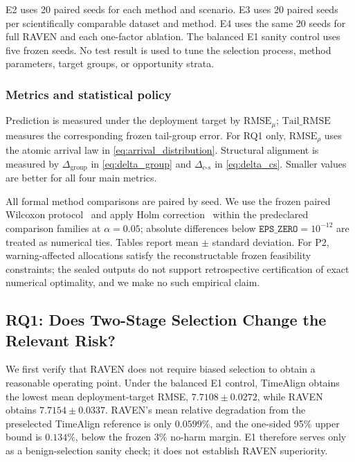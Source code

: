 \documentclass[letterpaper,journal]{IEEEtran}
\begin{document}
E2 uses 20 paired seeds for each method and scenario.  E3 uses 20 paired seeds
per scientifically comparable dataset and method.  E4 uses the same 20 seeds
for full RAVEN and each one-factor ablation.  The balanced E1 sanity control
uses five frozen seeds.  No test result is used to tune the selection process,
method parameters, target groups, or opportunity strata.

\subsubsection{Metrics and statistical policy}

Prediction is measured under the deployment target by $\mathrm{RMSE}_{\mu}$;
$\mathrm{Tail\_RMSE}$ measures the corresponding frozen tail-group error.
For RQ1 only, $\mathrm{RMSE}_{\rho}$ uses the atomic arrival law in
\eqref{eq:arrival_distribution}.  Structural alignment is measured by
$\Delta_{\mathrm{group}}$ in \eqref{eq:delta_group} and
$\Delta_{c\text{-}s}$ in \eqref{eq:delta_cs}.  Smaller values are better for
all four main metrics.

All formal method comparisons are paired by seed.  We use the frozen paired
Wilcoxon protocol~\cite{wilcoxon1945individual} and apply Holm
correction~\cite{holm1979simple} within the predeclared comparison
families at $\alpha=0.05$; absolute differences below
$\texttt{EPS\_ZERO}=10^{-12}$ are treated as numerical ties.  Tables report
mean $\pm$ standard deviation.  For P2, warning-affected allocations satisfy
the reconstructable frozen feasibility constraints; the sealed outputs do not
support retrospective certification of exact numerical optimality, and we make
no such empirical claim.

\subsection{RQ1: Does Two-Stage Selection Change the Relevant Risk?}
\label{subsec:eval_rq1}

We first verify that RAVEN does not require biased selection to obtain a
reasonable operating point.  Under the balanced E1 control, TimeAlign obtains
the lowest mean deployment-target RMSE, $7.7108\pm0.0272$, while RAVEN obtains
$7.7154\pm0.0337$.  RAVEN's mean relative degradation from the preselected
TimeAlign reference is only $0.0599\%$, and the one-sided 95\% upper bound is
$0.134\%$, below the frozen 3\% no-harm margin.  E1 therefore serves only as a
benign-selection sanity check; it does not establish RAVEN superiority.
\end{document}
